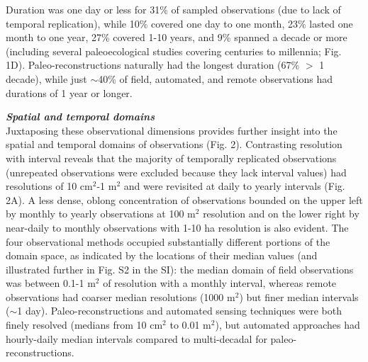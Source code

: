 \documentclass[12pt]{article}
\begin{document}
Duration was one day or less for 31\% of sampled observations (due to lack of temporal replication), while 10\% covered one day to one month, 23\% lasted one month to one year, 27\% covered 1-10 years, and 9\% spanned a decade or more (including several paleoecological studies covering centuries to millennia; Fig. 1D). Paleo-reconstructions naturally had the longest duration (67\% $>$ 1 decade), while just $\sim$40\% of field, automated, and remote observations had durations of 1 year or longer.

\noindent \textbf{\emph{Spatial and temporal domains}}\\
Juxtaposing these observational dimensions provides further insight into the spatial and temporal domains of observations (Fig. 2). Contrasting resolution with interval reveals that the majority of temporally replicated observations (unrepeated observations were excluded because they lack interval values) had resolutions of 10 cm$^2$-1 m$^2$ and were revisited at daily to yearly intervals (Fig. 2A). A less dense, oblong concentration of observations bounded on the upper left by monthly to yearly observations at 100 m$^2$ resolution and on the lower right by near-daily to monthly observations with 1-10 ha resolution is also evident. The four observational methods occupied substantially different portions of the domain space, as indicated by the locations of their median values (and illustrated further in Fig. S2 in the SI): the median domain of field observations was between 0.1-1 m$^2$ of resolution with a monthly interval, whereas remote observations had coarser median resolutions (1000 m$^2$) but finer median intervals ($\sim$1 day). Paleo-reconstructions and automated sensing techniques were both finely resolved (medians from 10 cm$^2$ to 0.01 m$^2$), but automated approaches had hourly-daily median intervals compared to multi-decadal for paleo-reconstructions. 

\end{document}
